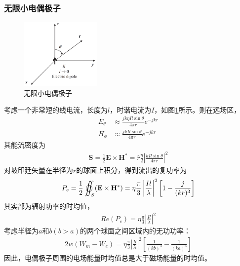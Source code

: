 \documentclass{article}
\numberwithin{equation}{section}
\begin{document}
\subsubsection{无限小电偶极子}
\begin{figure}[ht]
    \centering
    \includegraphics[width=0.35\textwidth]{无限小电偶极子.PNG}
    \caption{无限小电偶极子}
    \label{fig:fig1}
\end{figure}
考虑一个非常短的线电流，长度为$l$，时谐电流为$I$，如图\ref{fig:fig1}所示。则在远场区，
\begin{align}
    \label{eq:eq126}
    E_{\theta}&\approx\frac{jk\eta Il\sin\theta}{4\pi r}e^{-jkr} \\
    \label{eq:eq127}
    H_{\phi}&\approx\frac{jkIl\sin\theta}{4\pi r}e^{-jkr}
\end{align}
其能流密度为
\begin{align}
    \label{eq:eq128}
    \mathbf{S}=\frac{1}{2}\mathbf{E}\times\mathbf{H}^*=\hat{r}\frac{\eta}{2}\left|\frac{kIl\sin\theta}{4\pi r}\right|^2
\end{align}
对坡印廷矢量在半径为$r$的球面上积分，得到流出的复功率为
\begin{align}
    \label{eq:eq129}
    P_e=\frac{1}{2}\varoiint_S(\mathbf{E}\times\mathbf{H}^*)=\eta\frac{\pi}{3}\left|\frac{Il}{\lambda}\right|^2\left[1-\frac{j}{(kr)^3}\right]
\end{align}
其实部为辐射功率的时均值，
\begin{align}
    \label{eq:eq130}
    Re(P_e)=\eta\frac{\pi}{3}\left|\frac{Il}{\lambda}\right|^2
\end{align}
考虑半径为$a$和$b(b>a)$的两个球面之间区域内的无功功率：
\begin{align}
    \label{eq:eq131}
    2w(W_m-W_e)=\eta\frac{\pi}{3}\left|\frac{Il}{\lambda}\right|^2\left[\frac{1}{(kb)^3}-\frac{1}{(ka)^3}\right]
\end{align}
因此，电偶极子周围的电场能量时均值总是大于磁场能量的时均值。
\end{document}
